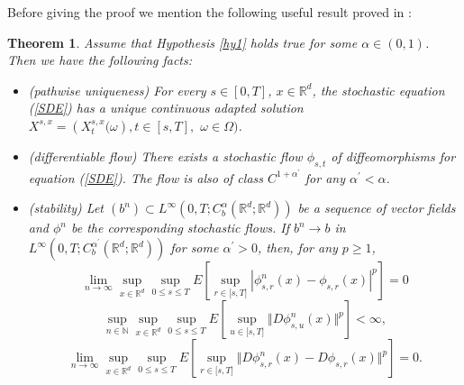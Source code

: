 \documentclass{article}
\newtheorem{theorem}{Theorem}
\begin{document}
Before giving the proof we mention the following useful result proved in
\cite[Theorem 5]{FGP}:
\begin{theorem}
\label{th:flow1} Assume that Hypothesis \ref{hy1} holds true for some
$\alpha\in(0,1)$. Then we have the following facts:
\begin{itemize}
\item[(i)] (pathwise uniqueness) For every $s\in\left[  0,T\right]  $,
$x\in{\mathbb{R}}^{d}$, the stochastic equation (\ref{SDE}) has a unique
continuous adapted solution $X^{s,x}=\left(  X_{t}^{s,x}\big(\omega\right)
,t\in\left[  s,T\right]  ,$ $\omega\in\Omega\big)$.
\item[(ii)] (differentiable flow) There exists a stochastic flow $\phi_{s,t}$
of diffeomorphisms for equation (\ref{SDE}). The flow is also of class
$C^{1+{\alpha}^{\prime}}$ for any ${\alpha}^{\prime}<{\alpha}$.
\item[(iii)] (stability) Let $(b^{n})\subset L^{\infty}\left(  0,T;C_{b}%
^{\alpha}({\mathbb{R}}^{d};{\mathbb{R}}^{d})\right)  $ be a sequence of vector
fields and $\phi^{n}$ be the corresponding stochastic flows. If $b^{n}%
\rightarrow b$ in $L^{\infty}( 0,T;C_{b}^{\alpha^{\prime}}({\mathbb{R}}%
^{d};{\mathbb{R}}^{d})) $ for some $\alpha^{\prime}>0$, then, for any $p\geq
1$,
\begin{equation}
\lim_{n\rightarrow\infty}\sup_{x\in{\mathbb{R}}^{d}}\sup_{0\leq s\leq T}%
E[\sup_{r\in\lbrack s,T]}|\phi_{s,r}^{n}(x)-\phi_{s,r}(x)|^{p}%
]=0\label{stability1}%
\end{equation}
\begin{equation}
\sup_{n\in\mathbb{N}}\sup_{x\in{\mathbb{R}}^{d}}\sup_{0\leq s\leq T}%
E[\sup_{u\in\lbrack s,T]}\Vert D\phi_{s,u}^{n}(x)\Vert^{p}]<\infty
,\label{bound}%
\end{equation}
\begin{equation}
\lim_{n\rightarrow\infty}\sup_{x\in{\mathbb{R}}^{d}}\sup_{0\leq s\leq T}%
E[\sup_{r\in\lbrack s,T]}\Vert D\phi_{s,r}^{n}(x)-D\phi_{s,r}(x)\Vert
^{p}]=0.\label{stability2}%
\end{equation}
\end{itemize}
\end{theorem}
\end{document}

